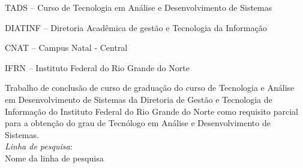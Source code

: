 
\instituicao
{
   TADS -- Curso de Tecnologia em Análise e Desenvolvimento de
   Sistemas\par
   DIATINF -- Diretoria Acadêmica de gestão e Tecnologia da Informação\par
   CNAT -- Campus Natal - Central\par
   IFRN -- Instituto Federal do Rio Grande do Norte }

\comentario
{
	Trabalho de conclusão de curso de graduação do curso de Tecnologia e Análise em
	Desenvolvimento de Sistemas da Diretoria de Gestão e Tecnologia de Informação
	do Instituto Federal do Rio Grande do Norte como requisito parcial para a
	obtenção do grau de Tecnólogo em Análise e Desenvolvimento de
	Sistemas.\bigskip\\
   \textit{Linha de pesquisa}:\\Nome da linha de pesquisa
}


\folhaderosto
